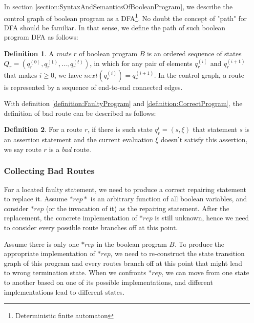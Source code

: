 \documentclass[10pt,journal,final,]{article}
\theoremstyle{definition}
\newtheorem{definition}{Definition}[section]
\begin{document}
In section \ref{section:SyntaxAndSemanticsOfBooleanProgram}, we describe the control graph of boolean program as a DFA\footnote{Deterministic finite automaton}. No doubt the concept of "path" for DFA should be familiar. In that sense, we define the path of such boolean program DFA as follows:

\begin{definition}
A {\it route} $r$ of boolean program $B$ is an ordered sequence of states $Q_{r}=(q_{r}^{(0)},q_{r}^{(1)},\dots,q_{r}^{(t)})$, in which for any pair of elements $q_{r}^{(i)}$ and $q_{r}^{(i + 1)}$ that makes $i \ge 0$, we have $next(q_{r}^{(i)}) = q_{r}^{(i + 1)}$. In the control graph, a route is represented by a sequence of end-to-end connected edges.
\end{definition}

With definition \ref{definition:FaultyProgram} and \ref{definition:CorrectProgram}, the definition of bad route can be described as follows:

\begin{definition}
For a route $r$, if there is such state $q_r^{i} = (s,\xi)$ that statement $s$ is an assertion statement and the current evaluation $\xi$ doesn't satisfy this assertion, we say route $r$ is a {\it bad} route.
\end{definition}

\subsubsection{Collecting Bad Routes}
\label{section:CollectingBadRoutes}
For a located faulty statement, we need to produce a correct repairing statement to replace it.
Assume $*rep*$ is an arbitrary function of all boolean variables, and consider $*rep$ (or the invocation of it) as the repairing statement.
After the replacement, the concrete implementation of $*rep$ is still unknown, hence we need to consider every possible route branches off at this point.

Assume there is only one $*rep$ in the boolean program $B$. To produce the appropriate implementation of $*rep$, we need to re-construct the state transition graph of this program and every routes branch off at this point
that might lead to wrong termination state.
When we confronts $*rep$, we can move from one state to another based on one of its possible implementations, and different implementations lead to different states.
\end{document}
